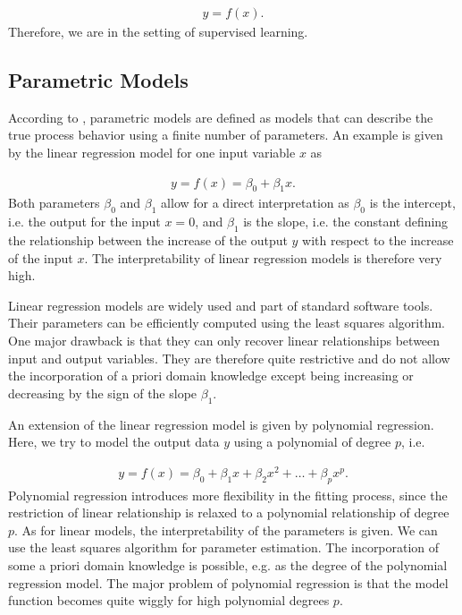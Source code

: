 \begin{align} \label{eq:basic-model-structure}
	y = f(x).
\end{align}
%
Therefore, we are in the setting of supervised learning. 

\subsection{Parametric Models}

According to \cite{nelles2013nonlinear}, parametric models are defined as models that can describe the true process behavior using a finite number of parameters. An example is given by the linear regression model for one input variable $x$ as

\begin{align} \label{eq:classical-linear-model}
	y= f(x) = \beta_0 + \beta_1 x.
\end{align}
%
Both parameters $\beta_0$ and $\beta_1$ allow for a direct interpretation as $\beta_0$ is the intercept, i.e. the output for the input $x=0$, and $\beta_1$ is the slope, i.e. the constant defining the relationship between the increase of the output $y$ with respect to the increase of the input $x$.  The interpretability of linear regression models is therefore very high. 

Linear regression models are widely used and part of standard software tools. Their parameters can be efficiently computed using the least squares algorithm. One major drawback is that they can only recover linear relationships between input and output variables. They are therefore quite restrictive and do not allow the incorporation of a priori domain knowledge except being increasing or decreasing by the sign of the slope $\beta_1$. 

An extension of the linear regression model is given by polynomial regression. Here, we try to model the output data $y$ using a polynomial of degree $p$, i.e.

\begin{align} \label{eq:polynomial-model}
	y = f(x) = \beta_0 + \beta_1 x + \beta_2 x^2 + \dots + \beta_p x^p.
\end{align}
%
Polynomial regression introduces more flexibility in the fitting process, since the restriction of linear relationship is relaxed to a polynomial relationship of degree $p$. As for linear models, the interpretability of the parameters is given. We can use the least squares algorithm for parameter estimation. The incorporation of some a priori domain knowledge is possible, e.g. as the degree of the polynomial regression model. The major problem of polynomial regression is that the model function becomes quite wiggly for high polynomial degrees $p$. 

